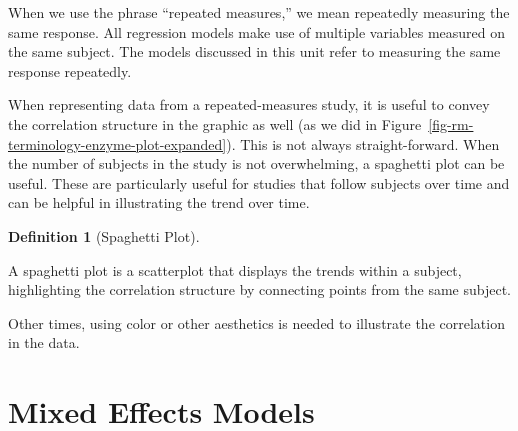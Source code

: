 \documentclass[
  letterpaper,
  DIV=11,
  numbers=noendperiod]{scrreprt}
\theoremstyle{definition}
\newtheorem{definition}{Definition}[chapter]
\theoremstyle{definition}
\theoremstyle{remark}
\begin{document}
\begin{tcolorbox}[enhanced jigsaw, left=2mm, toprule=.15mm, arc=.35mm, breakable, opacitybacktitle=0.6, opacityback=0, rightrule=.15mm, colbacktitle=quarto-callout-note-color!10!white, coltitle=black, leftrule=.75mm, toptitle=1mm, colframe=quarto-callout-note-color-frame, titlerule=0mm, title=\textcolor{quarto-callout-note-color}{\faInfo}\hspace{0.5em}{Note}, bottomrule=.15mm, colback=white, bottomtitle=1mm]

When we use the phrase ``repeated measures,'' we mean repeatedly
measuring the same response. All regression models make use of multiple
variables measured on the same subject. The models discussed in this
unit refer to measuring the same response repeatedly.

\end{tcolorbox}

When representing data from a repeated-measures study, it is useful to
convey the correlation structure in the graphic as well (as we did in
Figure~\ref{fig-rm-terminology-enzyme-plot-expanded}). This is not
always straight-forward. When the number of subjects in the study is not
overwhelming, a spaghetti plot can be useful. These are particularly
useful for studies that follow subjects over time and can be helpful in
illustrating the trend over time.

\begin{definition}[Spaghetti
Plot]\protect\hypertarget{def-spaghetti-plot}{}\label{def-spaghetti-plot}

A spaghetti plot is a scatterplot that displays the trends within a
subject, highlighting the correlation structure by connecting points
from the same subject.

\end{definition}

Other times, using color or other aesthetics is needed to illustrate the
correlation in the data.

\hypertarget{sec-rm-mixed-models}{%
\chapter{Mixed Effects Models}\label{sec-rm-mixed-models}}

\providecommand{\norm}[1]{\left\lVert#1\right\rVert}
\providecommand{\abs}[1]{\left\lvert#1\right\rvert}
\providecommand{\dist}[1]{\stackrel{\text{#1}}{\sim}}
\providecommand{\ind}[1]{\mathbb{I}\left(#1\right)}
\providecommand{\bm}[1]{\mathbf{#1}}
\providecommand{\bs}[1]{\boldsymbol{#1}}
\providecommand{\Ell}{\mathcal{L}}
\providecommand{\indep}{\perp\negthickspace\negmedspace\perp}
\end{document}
